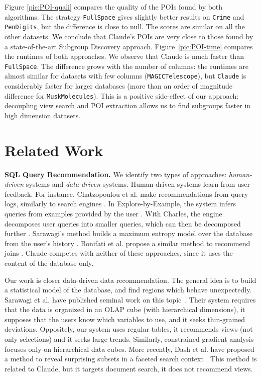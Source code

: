 Figure \ref{pic:POI-quali} compares the quality of the POIs found by both
algorithms. The strategy \texttt{FullSpace} gives slightly better results on
\texttt{Crime} and \texttt{PenDigits}, but the difference is close to null. The
scores are similar on all the other datasets. We conclude that Claude's POIs
are very close to those found by a state-of-the-art Subgroup Discovery
approach.  Figure~\ref{pic:POI-time} compares the runtimes of both approaches.
We observe that Claude is much faster than \texttt{FullSpace}. The difference
grows with the number of columns: the runtimes are almost similar for datasets
with few columns (\texttt{MAGICTelescope}), but \texttt{Claude} is considerably
faster for larger databases (more than an order of magnitude difference for
\texttt{MuskMolecules}). This is a positive side-effect of our approach:
decoupling view search and POI extraction allows us to find subgroups faster in
high dimension datasets.

\section{Related Work}
\label{sec:related}

\textbf{SQL Query Recommendation.} We identify two types of approaches:
\emph{human-driven} systems and \emph{data-driven} systems. Human-driven
systems learn from user feedback. For instance, Chatzopoulou et al.  make
recommendations from query logs, similarly to search engines
\cite{chatzopoulou2009query}. In Explore-by-Example, the system infers queries
from examples provided by the user \cite{dimitriadou2014explore}. With Charles,
the engine decomposes user queries into smaller queries, which can then be
decomposed further \cite{sellam2013meet}.  Sarawagi's method builds a maximum
entropy model over the database from the user's history
\cite{sarawagi2000user}. Bonifati et al. propose a similar method to recommend
joins \cite{bonifati2014interactive}.  Claude competes with neither of these
approaches, since it uses the content of the database only.

Our work is closer data-driven data recommendation. The general idea is to
build a statistical model of the database, and find regions which behave
unexpectedly. Sarawagi et al. have published seminal work on this
topic~\cite{sarawagi1998discovery}. Their system requires that the data is
organized in an OLAP cube (with hierarchical dimensions), it supposes that the
users know which variables to use, and it seeks thin-grained deviations.
Oppositely, our system uses regular tables, it recommends views (not only
selections) and it seeks large trends. Similarly, constrained gradient
analysis~\cite{imielinski2002cubegrades, dong2001mining} focuses only on
hierarchical data cubes. More recently, Dash et al. have proposed a method to
reveal surprising subsets in a faceted search context \cite{dash2008dynamic}.
This method is related to Claude, but it targets document search, it does not
recommend views.

